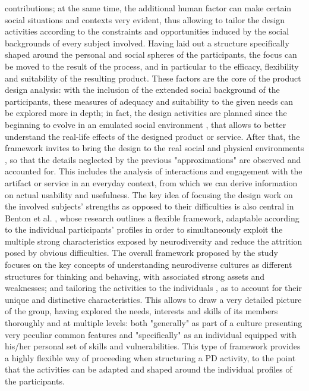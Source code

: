 contributions; at the same time, the additional human factor can make certain social
situations and contexts very evident, thus allowing to tailor the design activities according
to the constraints and opportunities induced by the social backgrounds of every subject
involved.
Having laid out a structure specifically shaped around the personal and social spheres of
the participants, the focus can be moved to the result of the process, and in particular to
the efficacy, flexibility and suitability of the resulting product. These factors are the core
of the product design analysis: with the inclusion of the extended social background of
the participants, these measures of adequacy and suitability to the given needs can be
explored more in depth; in fact, the design activities are planned since the beginning to
evolve in an emulated social environment , that allows to better understand the real-life
effects of the designed product or service.
After that, the framework invites to bring the design to the real social and physical
environments , so that the details neglected by the previous "approximations" are
observed and accounted for. This includes the analysis of interactions and engagement with the artifact or service in an everyday context, from which we can derive information
on actual usability and usefulness.
The key idea of focusing the design work on the involved subjects' strengths as opposed
to their difficulties is also central in Benton et al. \cite{Benton}, whose research outlines a flexible
framework, adaptable according to the individual participants' profiles in order to
simultaneously exploit the multiple strong characteristics exposed by neurodiversity and
reduce the attrition posed by obvious difficulties.
The overall framework proposed by the study focuses on the key concepts of
understanding neurodiverse cultures as different structures for thinking and behaving,
with associated strong assets and weaknesses; and tailoring the activities to the
individuals , as to account for their unique and distinctive characteristics. This allows to
draw a very detailed picture of the group, having explored the needs, interests and skills
of its members thoroughly and at multiple levels: both "generally" as part of a culture
presenting very peculiar common features and "specifically" as an individual equipped
with his/her personal set of skills and vulnerabilities.
This type of framework provides a highly flexible way of proceeding when structuring a
PD activity, to the point that the activities can be adapted and shaped around the
individual profiles of the participants.
